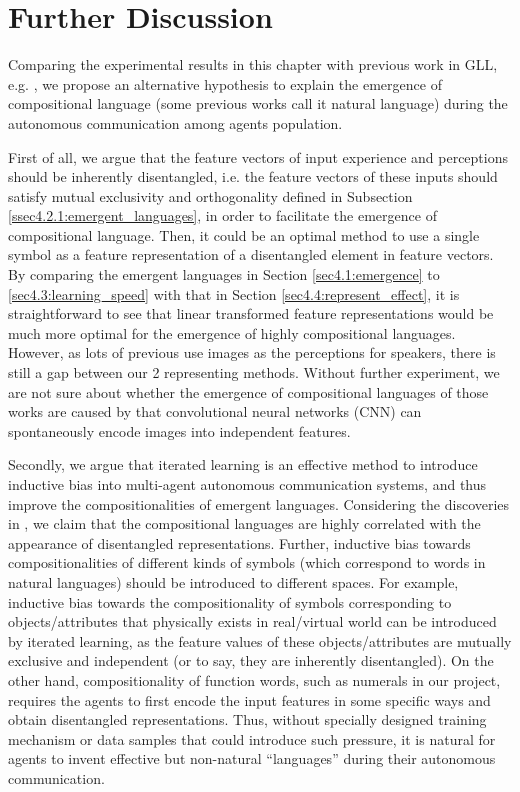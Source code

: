 \section{Further Discussion}
\label{sec4.5:discuss}

Comparing the experimental results in this chapter with previous work in GLL, e.g. \cite{kottur2017natural, hermann2017grounded, havrylov2017emergence, mordatch2018emergence}, we propose an alternative hypothesis to explain the emergence of compositional language (some previous works call it natural language) during the autonomous communication among agents population.

First of all, we argue that the feature vectors of input experience and perceptions should be inherently disentangled, i.e. the feature vectors of these inputs should satisfy mutual exclusivity and orthogonality defined in Subsection \ref{ssec4.2.1:emergent_languages}, in order to facilitate the emergence of compositional language. Then, it could be an optimal method to use a single symbol as a feature representation of a disentangled element in feature vectors. By comparing the emergent languages in Section \ref{sec4.1:emergence} to \ref{sec4.3:learning_speed} with that in Section \ref{sec4.4:represent_effect}, it is straightforward to see that linear transformed feature representations would be much more optimal for the emergence of highly compositional languages. However, as lots of previous use images as the perceptions for speakers, there is still a gap between our 2 representing methods. Without further experiment, we are not sure about whether the emergence of compositional languages of those works are caused by that convolutional neural networks (CNN) can spontaneously encode images into independent features.

Secondly, we argue that iterated learning is an effective method to introduce inductive bias into multi-agent autonomous communication systems, and thus improve the compositionalities of emergent languages. Considering the discoveries in \cite{locatello2018challenging}, we claim that the compositional languages are highly correlated with the appearance of disentangled representations. Further, inductive bias towards compositionalities of different kinds of symbols (which correspond to words in natural languages) should be introduced to different spaces. For example, inductive bias towards the compositionality of symbols corresponding to objects/attributes that physically exists in real/virtual world can be introduced by iterated learning, as the feature values of these objects/attributes are mutually exclusive and independent (or to say, they are inherently disentangled). On the other hand, compositionality of function words, such as numerals in our project, requires the agents to first encode the input features in some specific ways and obtain disentangled representations. Thus, without specially designed training mechanism or data samples that could introduce such pressure, it is natural for agents to invent effective but non-natural ``languages'' during their autonomous communication.